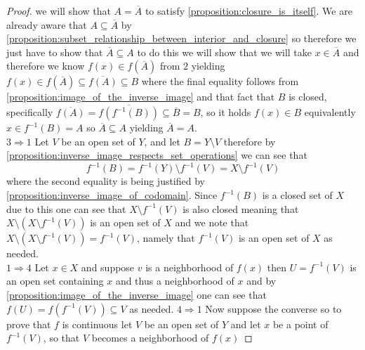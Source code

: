 \begin{proof}
     we will show that \( A = \overline{A}  \) to satisfy
     \ref{proposition:closure_is_itself}. We are already aware that \( A
     \subseteq \overline{A}  \) by
     \ref{proposition:subset_relationship_between_interior_and_closure} so
     therefore we just have to show that \( \overline{A} \subseteq  A \) to do
     this we will show that we will take \( x \in  \overline{A}  \) and therefore we know  
     \( f\left( x \right) \in  f\left( \overline{A}  \right)   \) from \( 2 \)
     yielding \( f\left( x \right) \in  f\left( \overline{A}  \right) \subseteq
     \overline{f\left( A \right) } \subseteq B\)  where the final equality
     follows from \ref{proposition:image_of_the_inverse_image} and that fact
     that \( B \) is closed, specifically \( \overline{f\left( A \right) } =
     \overline{f\left( f ^{-1} \left( B \right)  \right) } \subseteq
     \overline{B} = B  \), so it holds \( f\left( x \right) \in  B  \)
     equivalently \( x \in  f ^{-1} \left( B \right) = A \) so \( \overline{A}
     \subseteq A \) yielding \( \overline{A} = A \). \\
     \( 3 \Rightarrow 1 \) Let \( V \) be an open set of \( Y \), and let \( B
     = Y \setminus  V\) therefore by
     \ref{proposition:inverse_image_respects_set_operations} we can see that 
     \[
     f ^{-1} \left( B \right) =  f ^{-1} \left( Y \right) \setminus f ^{-1}
     \left( V \right) = X \setminus f ^{-1} \left( V \right) 
     \]
     where the second equality is being justified by
     \ref{proposition:inverse_image_of_codomain}. Since \( f ^{-1} \left( B
     \right)  \) is a closed set of \( X \) due to this one can see that \( X
     \setminus f ^{-1} \left( V \right)  \) is also closed meaning that \(
     X \setminus \left( X \setminus f ^{-1} \left( V \right)  \right)   \) is an
     open set of \( X \) and we note that \( X \setminus \left( X \setminus f
     ^{-1} \left( V \right)  \right) =  f ^{-1} \left( V \right) \), namely that
     \( f ^{-1} \left( V \right)  \) is an open set of \( X \) as needed.\\
     \( 1 \Rightarrow 4 \) Let \( x \in  X \) and suppose \( v \) is a
     neighborhood of \( f\left( x \right)  \) then \( U = f ^{-1} \left( V
     \right)  \) is an open set containing \( x \) and thus a neighborhood of \(
     x\) and by \ref{proposition:image_of_the_inverse_image} one can see that \(
     f\left( U \right) =  f\left( f ^{-1} \left( V \right)  \right) \subseteq V
     \) as needed.
     \( 4 \Rightarrow 1 \) Now suppose the converse so to prove that \( f \) is
     continuous let \( V \) be an open set of \( Y \) and let \( x \) be a point
     of \( f ^{-1} \left( V \right)  \), so that \( V \) becomes a neighborhood
     of \( f\left( x \right)  \) 
\end{proof}
